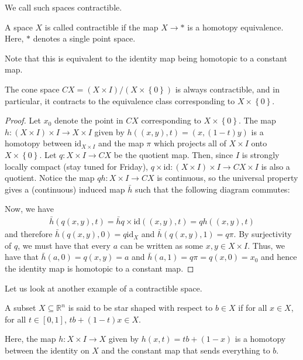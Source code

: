 \documentclass[12pt,reqno]{amsart}
\numberwithin{theorem}{section}
\theoremstyle{definition}
\theoremstyle{remark}
\numberwithin{equation}{section}
\newcommand{\set}[1]{\left \{ #1 \right \}}
\theoremstyle{definition}
\newcommand{\R}{\mathbb{R}}
\newcommand{\id}{\mathrm{id}}
\begin{document}
We call such spaces contractible.
\begin{definition}
    A space $X$ is called contractible if the map $X \rightarrow *$ is a homotopy equivalence. Here, $*$ denotes a single point space.
\end{definition}
Note that this is equivalent to the identity map being homotopic to a constant map.
\begin{example}
    The cone space $CX = (X\times I)/(X\times \set{0})$ is always contractible, and in particular, it contracts to the equivalence class corresponding to $X\times \set{0}$.
    \begin{proof}
    Let $x_0$ denote the point in $CX$ corresponding to $X\times \set{0}$. The map $h:(X\times I)\times I \rightarrow X \times I$ given by $h((x,y),t) = (x,(1-t)y)$ is a homotopy between $\id_{X\times I}$ and the map $\pi$ which projects all of $X\times I$ onto $X\times \set{0}$. Let $q:X\times I \rightarrow CX$ be the quotient map. Then, since $I$ is strongly locally compact (stay tuned for Friday), $q\times \id:(X\times I) \times I \rightarrow CX\times I$ is also a quotient. Notice the map $qh :X \times I \rightarrow CX$ is continuous, so the universal property gives a (continuous) induced map $\bar h$ such that the following diagram commutes:
        \begin{center}
        \end{center}
    Now, we have
    \begin{align*}
        \bar h (q(x,y),t)=\bar h q\times \id((x,y),t)  = qh((x,y),t)
    \end{align*}
    and therefore $\bar h (q(x,y),0) = q\id_X$ and $\bar h (q(x,y),1) = q \pi $. By surjectivity of $q$, we must have that every $a$ can be written as some $x,y \in X\times I$. Thus, we have that $\bar h(a,0) = q(x,y)=a$ and $\bar h (a,1) = q\pi = q(x,0) = x_0$ and hence the identity map is homotopic to a constant map.
    \end{proof}
\end{example}
Let us look at another example of a contractible space.
\begin{definition}
    A subset $X\subseteq \R^n$ is said to be star shaped with respect to $b \in X$ if for all $x \in X$, for all $t \in [0,1]$, $tb+(1-t)x \in X$. 
\end{definition}
Here, the map $h:X\times I\rightarrow X$ given by $h(x,t)=tb+(1-x)$ is a homotopy between the identity on $X$ and the constant map that sends everything to $b$.
\end{document}
